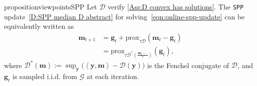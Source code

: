 \documentclass[10pt]{article} %
\renewcommand{\vec}[1]{\bm{#1}}
\newcommand{\bg}{\bm{g}}
\newcommand{\dotprod}[1]{\left< #1\right>}
\newcommand{\prox}[1]{\mathrm{prox}_{#1}}
\newcommand{\dist}{\mathcal{D}}
\newcommand{\SPP}{\texttt{SPP}}
\begin{document}
\begin{restatable}{proposition}{viewpointsSPP}\label{prop:viewpoints}
    Let $\mathcal{D}$ verify \cref{Ass:D convex has solutions}.
    The \SPP{} update~\eqref{D:SPP median D abstract} for solving~\eqref{eqn:online-spp-update} can be equivalently written as
    \begin{align}
        \vec{m}_{t+1} &=  \vec{g}_t + \prox{\tau\dist}(\vec{m}_t-\vec{g}_t) \label{eq:gtprox} \\
        &=  \prox{\tau\dist^*(\frac{\vec{m}_t - \cdot }{\tau})}(\vec{g}_t) , \label{eq:mtprox}
    \end{align}
    where $\dist^*(\vec{m}) := \sup_{\vec{y}} \big( \dotprod{\vec{y},\vec{m}} -  \dist(\vec{y}) \big)$ is the Fenchel conjugate of $\dist$, and $\bg_t$ is sampled i.i.d. from $\mathcal{G}$ at each iteration.
 \end{restatable}
\end{document}
